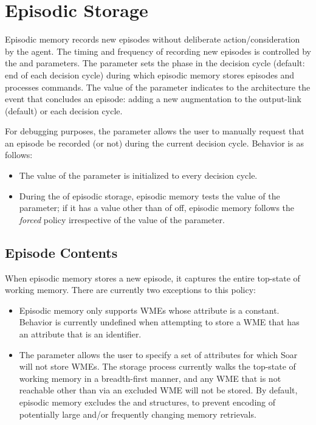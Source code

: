 \section{Episodic Storage}
\label{EPMEM-storage}

Episodic memory records new episodes without deliberate action/consideration by the agent. 
The timing and frequency of recording new episodes is controlled by the  and  parameters.  
The  parameter sets the phase in the decision cycle (default: end of each decision cycle) during which episodic memory stores episodes and processes commands.  
The value of the  parameter indicates to the architecture the event that concludes an episode: adding a new augmentation to the output-link (default) or each decision cycle.

For debugging purposes, the  parameter allows the user to manually request that an episode be recorded (or not) during the current decision cycle.  
Behavior is as follows:

\vspace{-8pt}
\begin{itemize}
\item 
	The value of the  parameter is initialized to  every decision cycle.
	\vspace{-6pt}
\item 
	During the  of episodic storage, episodic memory tests the value of the  parameter; if it has a value other than of off, episodic memory follows the \emph{forced} policy irrespective of the value of the  parameter.
	\vspace{-6pt}
\end{itemize}

\subsection{Episode Contents}

When episodic memory stores a new episode, it captures the entire top-state of working memory. 
There are currently two exceptions to this policy:

\begin{itemize}
\item 
Episodic memory only supports WMEs whose attribute is a constant. 
Behavior is currently undefined when attempting to store a WME that has an attribute that is an identifier.

\item 
The  parameter allows the user to specify a set of attributes for which Soar will not store WMEs. 
The storage process currently walks the top-state of working memory in a breadth-first manner, and any WME that is not reachable other than via an excluded WME will not be stored. 
By default, episodic memory excludes the  and  structures, to prevent encoding of potentially large and/or frequently changing memory retrievals.

\end{itemize}

